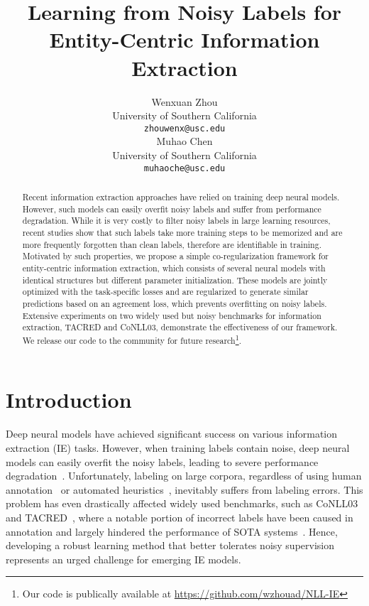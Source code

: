 \documentclass[11pt]{article}
\title{Learning from Noisy Labels for Entity-Centric Information Extraction}
\author{Wenxuan Zhou \\
  University of Southern California \\
  \texttt{zhouwenx@usc.edu} \\\And
  Muhao Chen \\
  University of Southern California \\
  \texttt{muhaoche@usc.edu} \\}
\begin{document}
\maketitle
\begin{abstract}
Recent information extraction approaches have relied on training deep neural models.
However, such models can easily overfit noisy labels and suffer from performance degradation.
While it is very costly to filter noisy labels in large learning resources, recent studies show that such labels take more training steps to be memorized and are more frequently forgotten than clean labels, therefore are identifiable in training.
Motivated by such properties, we propose a simple co-regularization framework for entity-centric information extraction, which consists of several neural models with identical structures but different parameter initialization. 
These models are jointly optimized with the task-specific losses and are regularized to generate similar predictions based on an agreement loss, which prevents overfitting on noisy labels.
Extensive experiments on two widely used but noisy benchmarks for information extraction, TACRED and CoNLL03, demonstrate the effectiveness of our framework.
We release our code to the community for future research\footnote{Our code is publically available at \url{https://github.com/wzhouad/NLL-IE}}.
\end{abstract}

\section{Introduction}
Deep neural models have achieved significant success on various information extraction (IE) tasks.
However, when training labels contain noise, deep neural models can easily overfit the noisy labels, leading to severe performance degradation~\cite{Arpit2017ACL,Zhang2017UnderstandingDL}.
Unfortunately, labeling on large corpora, regardless of using human annotation~\cite{raykar2010learning} or automated heuristics~\cite{song2015spectral}, inevitably suffers from labeling errors.
This problem has even drastically affected widely used benchmarks, such as CoNLL03~\cite{Sang2003IntroductionTT} and TACRED~\cite{Zhang2017PositionawareAA}, where a notable portion of incorrect labels have been caused in annotation and largely hindered the performance of SOTA systems~\cite{reiss2020identifying,Alt2020TACREDRA}.
Hence, developing a robust learning method that better tolerates noisy supervision represents an urged challenge for emerging IE models.
\end{document}
